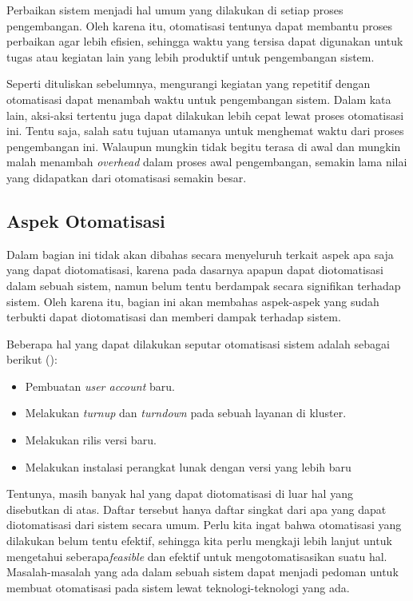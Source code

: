 Perbaikan sistem menjadi hal umum yang dilakukan di setiap proses pengembangan.
Oleh karena itu, otomatisasi tentunya dapat membantu proses perbaikan agar lebih efisien, sehingga waktu yang tersisa dapat digunakan untuk tugas atau kegiatan lain yang lebih produktif untuk pengembangan sistem.

Seperti dituliskan sebelumnya, mengurangi kegiatan yang repetitif dengan otomatisasi dapat menambah waktu untuk pengembangan sistem.
Dalam kata lain, aksi-aksi tertentu juga dapat dilakukan lebih cepat lewat proses otomatisasi ini.
Tentu saja, salah satu tujuan utamanya untuk menghemat waktu dari proses pengembangan ini.
Walaupun mungkin tidak begitu terasa di awal dan mungkin malah menambah \textit{overhead} dalam proses awal pengembangan, semakin lama nilai yang didapatkan dari otomatisasi semakin besar.

\subsection{Aspek Otomatisasi}
Dalam bagian ini tidak akan dibahas secara menyeluruh terkait aspek apa saja yang dapat diotomatisasi, karena pada dasarnya apapun dapat diotomatisasi dalam sebuah sistem, namun belum tentu berdampak secara signifikan terhadap sistem.
Oleh karena itu, bagian ini akan membahas aspek-aspek yang sudah terbukti dapat diotomatisasi dan memberi dampak terhadap sistem.

Beberapa hal yang dapat dilakukan seputar otomatisasi sistem adalah sebagai berikut (\cite{beyer2016site}):
\begin{itemize}
  \item Pembuatan \textit{user account} baru.
  \item Melakukan \textit{turnup} dan \textit{turndown} pada sebuah layanan di kluster.
  \item Melakukan rilis versi baru.
  \item Melakukan instalasi perangkat lunak dengan versi yang lebih baru
\end{itemize}

Tentunya, masih banyak hal yang dapat diotomatisasi di luar hal yang disebutkan di atas.
Daftar tersebut hanya daftar singkat dari apa yang dapat diotomatisasi dari sistem secara umum. 
Perlu kita ingat bahwa otomatisasi yang dilakukan belum tentu efektif, sehingga kita perlu mengkaji lebih lanjut untuk mengetahui seberapa\textit{feasible} dan efektif untuk mengotomatisasikan suatu hal.
Masalah-masalah yang ada dalam sebuah sistem dapat menjadi pedoman untuk membuat otomatisasi pada sistem lewat teknologi-teknologi yang ada.

